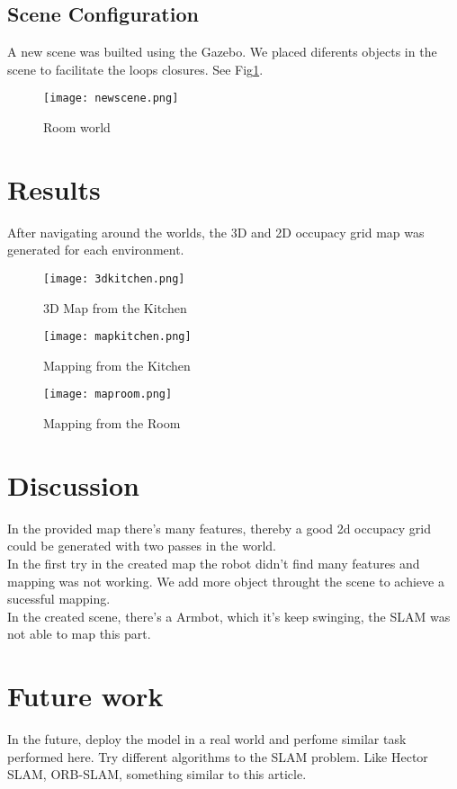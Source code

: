 \documentclass[10pt,journal,compsoc]{IEEEtran}
\begin{document}
\subsection{Scene Configuration}

A new scene was builted using the Gazebo. We placed diferents objects in the scene to facilitate the loops closures. See
Fig\ref{fig:room}.

\begin{figure}[thpb]
      \centering
      \texttt{[image: newscene.png]}
      \caption{Room world}
      \label{fig:room}
\end{figure}

\section{Results}

After navigating around the worlds, the 3D and 2D occupacy grid map was generated for each environment. 

\begin{figure}[thpb]
      \centering
      \texttt{[image: 3dkitchen.png]}
      \caption{3D Map from the Kitchen}
\end{figure}

\begin{figure}[thpb]
      \centering
      \texttt{[image: mapkitchen.png]}
      \caption{Mapping from the Kitchen}
\end{figure}

\begin{figure}[thpb]
      \centering
      \texttt{[image: maproom.png]}

      \caption{Mapping from the Room}
\end{figure}

\section{Discussion}

In the provided map there's many features, thereby a good 2d occupacy grid could be generated with two passes in the
world.\\
In the first try in the created map the robot didn't find many features and mapping was not working. We add more object
throught the scene to achieve a sucessful mapping.\\
In the created scene, there's a Armbot, which it's keep swinging, the SLAM was not able to map this part.

 
\section{Future work}

    In the future, deploy the model in a real world and perfome similar task performed here.
    Try different algorithms to the SLAM problem. Like Hector SLAM, ORB-SLAM, something similar to this article\cite{VehicularTechnologySociety2017}.


\nocite{*}


\end{document}
